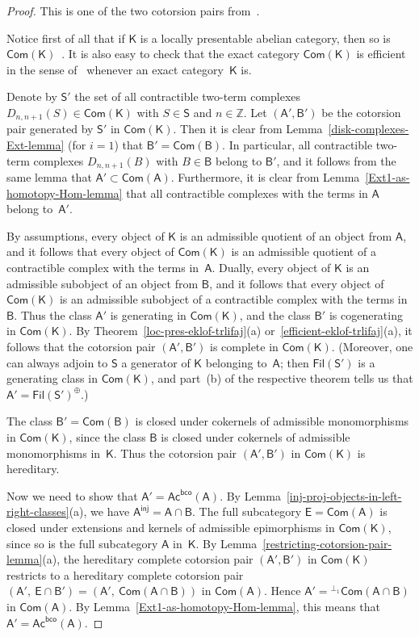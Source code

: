 \documentclass[12pt,a4paper]{amsart}
\newcommand{\+}{\nobreakdash-}
\renewcommand{\:}{\colon}
\newcommand{\sA}{\mathsf A}
\newcommand{\sB}{\mathsf B}
\newcommand{\sE}{\mathsf E}
\newcommand{\sK}{\mathsf K}
\newcommand{\sS}{\mathsf S}
\newcommand{\Com}{\mathsf{Com}}
\newcommand{\Ac}{\mathsf{Ac}}
\newcommand{\Fil}{\mathsf{Fil}}
\newcommand{\inj}{\mathsf{inj}}
\newcommand{\bco}{\mathsf{bco}}
\newcommand{\boZ}{\mathbb Z}
\theoremstyle{plain}
\theoremstyle{definition}
\begin{document}
\begin{proof}
 This is one of the two cotorsion pairs
from~\cite[Proposition~3.2]{Gil2}.

 Notice first of all that if $\sK$ is a locally presentable abelian
category, then so is $\Com(\sK)$ \,\cite[Lemma~6.3]{PS4}.
 It is also easy to check that the exact category $\Com(\sK)$ is
efficient in the sense of~\cite[Definition~3.4]{Sto-ICRA} whenever
an exact category~$\sK$ is.

 Denote by $\sS'$ the set of all contractible two-term complexes
$D_{n,n+1}(S)\in\Com(\sK)$ with $S\in\sS$ and $n\in\boZ$.
 Let $(\sA',\sB')$ be the cotorsion pair generated by $\sS'$ in
$\Com(\sK)$.
 Then it is clear from Lemma~\ref{disk-complexes-Ext-lemma} (for $i=1$)
that $\sB'=\Com(\sB)$.
 In particular, all contractible two-term complexes $D_{n,n+1}(B)$
with $B\in\sB$ belong to $\sB'$, and it follows from the same lemma
that $\sA'\subset\Com(\sA)$.
 Furthermore, it is clear from Lemma~\ref{Ext1-as-homotopy-Hom-lemma}
that all contractible complexes with the terms in $\sA$ belong
to~$\sA'$.

 By assumptions, every object of $\sK$ is an admissible quotient of
an object from $\sA$, and it follows that every object of $\Com(\sK)$
is an admissible quotient of a contractible complex with the terms
in~$\sA$.
 Dually, every object of $\sK$ is an admissible subobject of an object
from $\sB$, and it follows that every object of $\Com(\sK)$ is
an admissible subobject of a contractible complex with the terms
in~$\sB$.
 Thus the class $\sA'$ is generating in $\Com(\sK)$, and the class
$\sB'$ is cogenerating in $\Com(\sK)$.
 By Theorem~\ref{loc-pres-eklof-trlifaj}(a)
or~\ref{efficient-eklof-trlifaj}(a), it follows that the cotorsion pair
$(\sA',\sB')$ is complete in $\Com(\sK)$.
 (Moreover, one can always adjoin to $\sS$ a generator of $\sK$
belonging to~$\sA$; then $\Fil(\sS')$ is a generating class in
$\Com(\sK)$, and part~(b) of the respective theorem tells us that
$\sA'=\Fil(\sS')^\oplus$.)

 The class $\sB'=\Com(\sB)$ is closed under cokernels of admissible
monomorphisms in $\Com(\sK)$, since the class $\sB$ is closed under
cokernels of admissible monomorphisms in~$\sK$.
 Thus the cotorsion pair $(\sA',\sB')$ in $\Com(\sK)$ is hereditary.

 Now we need to show that $\sA'=\Ac^\bco(\sA)$.
 By Lemma~\ref{inj-proj-objects-in-left-right-classes}(a), we have
$\sA^\inj=\sA\cap\sB$.
 The full subcategory $\sE=\Com(\sA)$ is closed under extensions and
kernels of admissible epimorphisms in $\Com(\sK)$, since so is the full
subcategory $\sA$ in~$\sK$.
 By Lemma~\ref{restricting-cotorsion-pair-lemma}(a), the hereditary
complete cotorsion pair $(\sA',\sB')$ in $\Com(\sK)$ restricts to
a hereditary complete cotorsion pair $(\sA',\>\sE\cap\sB')=
(\sA',\>\Com(\sA\cap\sB))$ in $\Com(\sA)$.
 Hence $\sA'={}^{\perp_1}\Com(\sA\cap\sB)$ in $\Com(\sA)$.
 By Lemma~\ref{Ext1-as-homotopy-Hom-lemma}, this means that
$\sA'=\Ac^\bco(\sA)$.


\end{proof}
\end{document}
